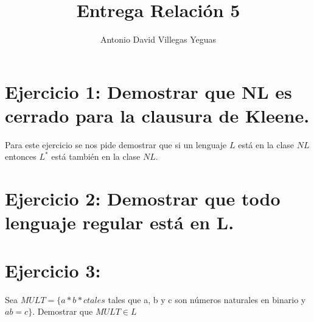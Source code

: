 \documentclass{article}
\title{Entrega Relación 5}
\author{Antonio David Villegas Yeguas}
\date{}
\begin{document}
\maketitle


\section*{Ejercicio 1: Demostrar que NL es cerrado para la clausura de Kleene.}

Para este ejercicio se nos pide demostrar que si un lenguaje $L$ está en la clase $NL$ entonces $L^*$ está también en la clase $NL$.

\section*{Ejercicio 2: Demostrar que todo lenguaje regular está en L.}

\section*{Ejercicio 3:}

Sea $MULT = \{a * b * c tales$ tales que a, b y c son números naturales en binario y $a  b = c\}$. Demostrar que $MULT \in L$
\end{document}
